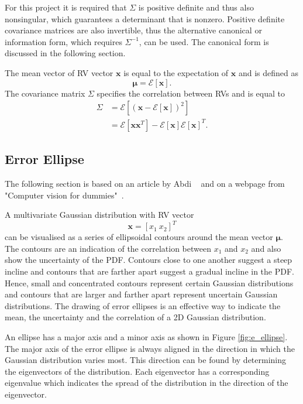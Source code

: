 \documentclass[12pt,oneside,openany,a4paper, %
afrikaans,english,
]{memoir}
\numberwithin{equation}{chapter}
\begin{document}
For this project it is required that $\Sigma$ is positive definite and thus also nonsingular, which guarantees a determinant that is nonzero. Positive definite covariance matrices are also invertible, thus the alternative canonical or information form, which requires $\Sigma^{-1}$, can be used. The canonical form is discussed in the following section.

The mean vector of RV vector $\bm{x}$ is equal to the expectation of $\bm{x}$ and is defined as
\begin{equation}
\bm{\mu} = \mathcal{E}[\bm{x}].
\end{equation}
The covariance matrix $\Sigma$ specifies the correlation between RVs and is equal to
\begin{equation}\label{eq:defCovariance}
\begin{split}
\Sigma & = \mathcal{E}\left[(\bm{x} - \mathcal{E}[\bm{x}])^2\right]\\
& = \mathcal{E}[\bm{xx}^T] - \mathcal{E}[\bm{x}]\mathcal{E}[\bm{x}]^T.
\end{split}
\end{equation}
\subsection{Error Ellipse}The following section is based on an article by Abdi ~\cite{abdi} and on a webpage from "Computer vision for dummies"~\cite{draw_ellipse}.

A multivariate Gaussian distribution with RV vector
\begin{equation}
\bm{x} = [x_1\ x_2]^T
\end{equation}
can be visualised as a series of ellipsoidal contours around the mean vector $\bm{\mu}$. The contours are an indication of the correlation between $x_1$ and $x_2$ and also show the uncertainty of the PDF. Contours close to one another suggest a steep incline and contours that are farther apart suggest a gradual incline in the PDF. Hence, small and concentrated contours represent certain Gaussian distributions and contours that are larger and farther apart represent uncertain Gaussian distributions. The drawing of error ellipses is an effective way to indicate the mean, the uncertainty and the correlation of a 2D Gaussian distribution.

An ellipse has a major axis and a minor axis as shown in Figure \ref{fig:e_ellipse}. The major axis of the error ellipse is always aligned in the direction in which the Gaussian distribution varies most. This direction can be found by determining the eigenvectors of the distribution. Each eigenvector has a corresponding eigenvalue which indicates the spread of the distribution in the direction of the eigenvector. 
\end{document}
